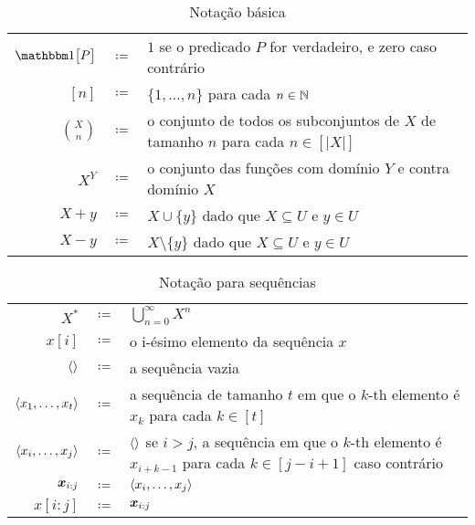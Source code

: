 \bgroup
	\renewcommand{\arraystretch}{1.2}
	\begin{table}[htbp]
	  \caption{Notação básica}
          \label{tbl:notation}
	  \centering
	  \begin{tabular}{r c p{13cm}}
	    \toprule
            \(\ind{P}\) & \(\coloneqq\)& \(1\) se o predicado \(P\) for verdadeiro, e zero caso contrário \\
            \([n]\)
            & \(\coloneqq\)
            & \(\{1, \dotsc, n\}\) para cada \(n
              \in \mathbb{N}\)\\
            \(\binom{X}{n}\) & \(\coloneqq\)& o conjunto de todos os subconjuntos de \(X\) de tamanho \(n\) para cada \(n \in [|X|]\) \\
            \(X^Y\) & \(\coloneqq\)& o conjunto das funções com domínio \(Y\)
                                     e contra domínio \(X\)\\
            \(X + y\) & \(\coloneqq\)& \(X \cup \{y\}\) dado que \(X\subseteq U\) e \(y \in U\) \\
            \(X - y\) & \(\coloneqq\)& \(X \setminus \{y\}\) dado que \(X\subseteq U\) e \(y \in U\)\\
            \bottomrule
	  \end{tabular}
	\end{table}
\egroup

\bgroup
	\renewcommand{\arraystretch}{1.2}
	\begin{table}[htbp]
	  \caption{Notação para sequências}
          \label{tbl:seq_notation}
	  \centering
	  \begin{tabular}{r c p{13cm}}
	    \toprule
            \(X^*\)
            &\(\coloneqq\)
            & \(\bigcup_{n = 0}^\infty X^n\)\\
            \(x[i]\)
            & \(\coloneqq\)
            & o i-ésimo elemento da sequência \(x\) \\
            \(\langle\rangle\)
            & \(\coloneqq\)
            & a sequência vazia\\
            \(\langle x_1, \dotsc, x_t\rangle\)
            & \(\coloneqq\)
            & a sequência de tamanho \(t\) em que o \(k\)-th
              elemento é \(x_k\) para cada \(k \in [t]\) \\
            \(\langle x_i, \dotsc, x_j\rangle\)
            & \(\coloneqq\)
            & \(\langle\rangle\) se \(i > j\), a sequência em que o \(k\)-th elemento
              é \(x_{i + k -1}\) para cada \(k \in [j - i + 1]\)
              caso contrário\\
            \(\bm{x}_{i:j}\)
            & \(\coloneqq\)
            & \(\langle x_i, \dotsc, x_j\rangle\)\\
            \(x[i:j]\)
            & \(\coloneqq\)
            & \(\bm{x}_{i:j}\) \\
            \bottomrule
	  \end{tabular}
	\end{table}
\egroup


